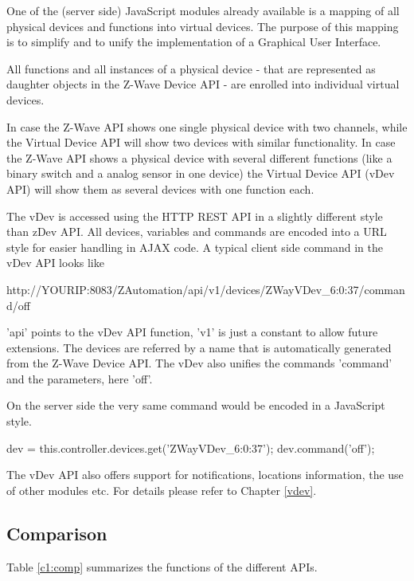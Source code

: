 One of the (server side) JavaScript modules already available is a mapping of all 
physical devices and functions into virtual devices. The purpose of this mapping is 
to simplify and to unify the implementation of a Graphical User Interface.

All functions and all instances of a physical device - that are represented as daughter
objects in the Z-Wave Device API -  are enrolled into individual virtual devices. 

In case the Z-Wave API shows one single physical device with two channels, while the Virtual Device 
API will show two devices with similar functionality. In case the Z-Wave API shows a physical
device with  several different functions (like a binary switch and a analog sensor in one 
device) the Virtual Device API (vDev API) will show them as several devices with one 
function each.

The vDev is accessed using the HTTP REST API in a slightly different style than zDev API. All 
devices, variables and commands are encoded into a URL style for easier handling in AJAX
code. A typical client side command in the vDev API looks like

\begin{center}

http://YOURIP:8083/ZAutomation/api/v1/devices/ZWayVDev\_6:0:37/command/off

\end{center}

'api' points to the vDev API function, 'v1' is just a constant to allow future extensions. 
The devices are referred by a name that is automatically generated from the Z-Wave 
Device API. The vDev also unifies the commands 'command' and the parameters, here 'off'.

On the server side the very same command would be encoded in a JavaScript style.

\begin{center}
	dev = this.controller.devices.get('ZWayVDev\_6:0:37');
	dev.command('off');
\end{center}

The vDev API also offers support for notifications, locations information, the use of other
modules etc. For details please refer to Chapter \ref{vdev}.

\subsection{Comparison}

Table \ref{c1:comp} summarizes the functions of the different APIs.


